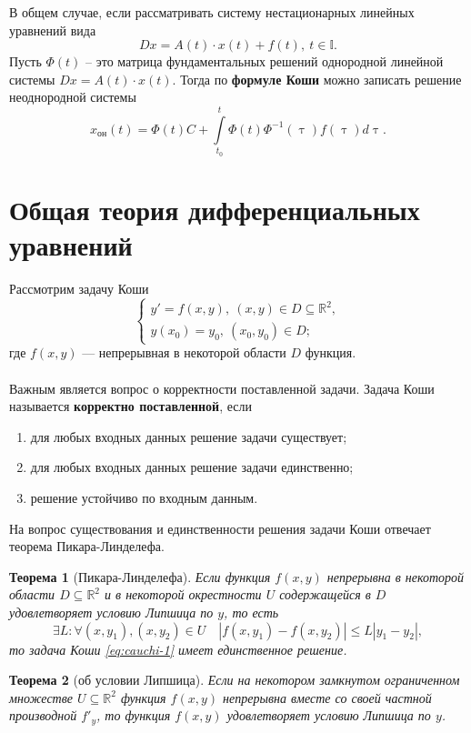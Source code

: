\documentclass[a4paper, 12pt]{report}
\numberwithin{equation}{section}
\renewcommand{\leq}{\leqslant}
\renewcommand{\tau}{\uptau}
\newtheorem*{theorem}{Теорема}
\begin{document}
	В общем случае, если рассматривать систему нестационарных линейных уравнений вида
	\begin{equation}
		Dx = A(t)\cdot x(t) + f(t),\ t \in \mathbb I.
	\end{equation}
	Пусть $\Phi(t)$ -- это матрица фундаментальных решений однородной линейной системы $Dx = A(t)\cdot x(t)$. Тогда по \textbf{формуле Коши} можно записать решение неоднородной системы
	\begin{equation}
		x_{\text{он}}(t) =\Phi(t) C + \int\limits_{t_0}^t \Phi(t) \Phi^{-1}(\tau)f(\tau)d\tau.
	\end{equation}
	\section{Общая теория дифференциальных уравнений}
	Рассмотрим задачу Коши 
	\begin{equation}
		\label{eq:cauchi-1}
		\begin{cases}
			y' = f(x,y),\ (x,y)\in D\subseteq \mathbb R^2,\\
			y(x_0) = y_0,\ (x_0,y_0)\in D;
		\end{cases}
	\end{equation}
	где $f(x,y)$ --- непрерывная в некоторой области $D$ функция.\\\\
	Важным является вопрос о корректности поставленной задачи. Задача Коши называется \textbf{корректно поставленной}, если
	\begin{enumerate}
		\item для любых входных данных решение задачи существует;
		\item для любых входных данных решение задачи единственно;
		\item решение устойчиво по входным данным.
	\end{enumerate}
	На вопрос существования и единственности решения задачи Коши отвечает теорема Пикара-Линделефа.
	\begin{theorem}
		[Пикара-Линделефа]
		Если функция $f(x,y)$ непрерывна в некоторой области $D\subseteq\mathbb R^2$ и в некоторой окрестности $U$ содержащейся в $D$ удовлетворяет условию Липшица по $y$, то есть $$\exists L:\forall (x,y_1),(x,y_2)\in U\quad |f(x,y_1) - f(x,y_2)| \leq L|y_1 - y_2|,$$
		то задача Коши \eqref{eq:cauchi-1} имеет единственное решение.
	\end{theorem}
	\begin{theorem}
		[об условии Липшица]
		Если на некотором замкнутом ограниченном множестве $U\subseteq \mathbb R^2$ функция $f(x,y)$ непрерывна вместе со своей частной производной $f'_y$, то функция $f(x,y)$ удовлетворяет условию Липшица по $y$.
	\end{theorem}
\end{document}
